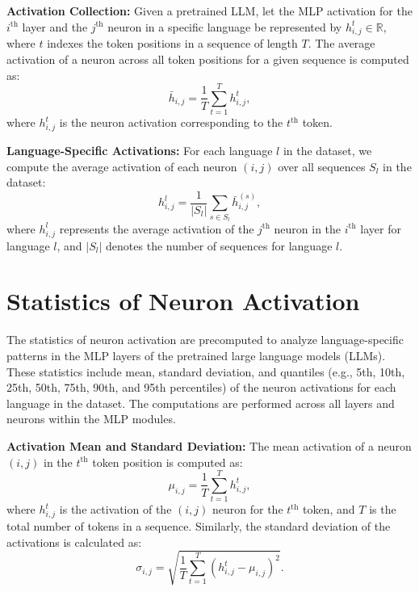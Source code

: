 \textbf{Activation Collection:} 
Given a pretrained LLM, let the MLP activation for the $i^\text{th}$ layer and the $j^\text{th}$ neuron in a specific language be represented by $h_{i,j}^t \in \mathbb{R}$, where $t$ indexes the token positions in a sequence of length $T$. The average activation of a neuron across all token positions for a given sequence is computed as:
\begin{equation}
\bar{h}_{i,j} = \frac{1}{T} \sum_{t=1}^{T} h_{i,j}^t,
\end{equation}
where $h_{i,j}^t$ is the neuron activation corresponding to the $t^\text{th}$ token.

\textbf{Language-Specific Activations:}
For each language $l$ in the dataset, we compute the average activation of each neuron $(i, j)$ over all sequences $S_l$ in the dataset:
\begin{equation}
h_{i,j}^l = \frac{1}{|S_l|} \sum_{s \in S_l} \bar{h}_{i,j}^{(s)},
\end{equation}
where $h_{i,j}^l$ represents the average activation of the $j^\text{th}$ neuron in the $i^\text{th}$ layer for language $l$, and $|S_l|$ denotes the number of sequences for language $l$.


\section{Statistics of Neuron Activation}

The statistics of neuron activation are precomputed to analyze language-specific patterns in the MLP layers of the pretrained large language models (LLMs). These statistics include mean, standard deviation, and quantiles (e.g., 5th, 10th, 25th, 50th, 75th, 90th, and 95th percentiles) of the neuron activations for each language in the dataset. The computations are performed across all layers and neurons within the MLP modules.

\textbf{Activation Mean and Standard Deviation:} The mean activation of a neuron $(i, j)$ in the $t^\text{th}$ token position is computed as:
\begin{equation}
\mu_{i,j} = \frac{1}{T} \sum_{t=1}^T h_{i,j}^t,
\end{equation}
where $h_{i,j}^t$ is the activation of the $(i,j)$ neuron for the $t^\text{th}$ token, and $T$ is the total number of tokens in a sequence. Similarly, the standard deviation of the activations is calculated as:
\begin{equation}
\sigma_{i,j} = \sqrt{\frac{1}{T} \sum_{t=1}^T (h_{i,j}^t - \mu_{i,j})^2}.
\end{equation}

